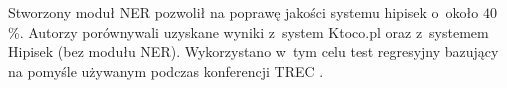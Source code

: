 Stworzony moduł NER pozwolił na poprawę jakości systemu hipisek o~około $40$\%. Autorzy porównywali uzyskane wyniki z~system Ktoco.pl oraz z~systemem Hipisek (bez modułu NER). Wykorzystano w~tym celu test regresyjny bazujący na pomyśle używanym podczas konferencji TREC \cite{polishQAS}.























